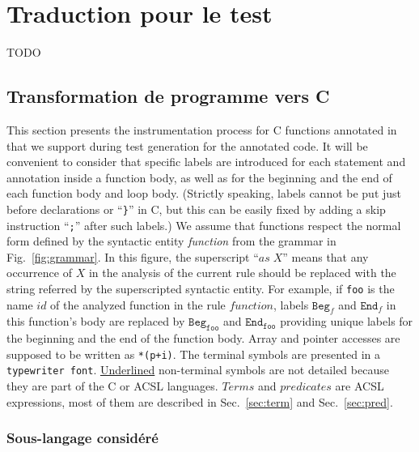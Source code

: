 
\chapter{Traduction pour le test}
\label{sec:traduction}

\chapterintro

TODO

\section{Transformation de programme \acsl vers C}





This section presents the instrumentation process for C functions annotated in
\acsl that we support during test generation for
the annotated code.
It will be convenient to consider that specific labels 
are introduced for each statement and annotation inside a function body, as well
as for  the beginning and the end of each function body and loop body. 
(Strictly speaking, labels cannot be put just before declarations or ``\lstinline|}|'' in C, but this
can be easily fixed by adding a skip instruction ``\lstinline{;}'' after such
labels.)
We assume that functions respect the normal form defined by the syntactic
entity \textit{function} from the grammar in Fig.~\ref{fig:grammar}. 
In this
figure, the superscript ``${\textit{as}\;X}$'' means that any occurrence of $X$
in the analysis of the current rule should be replaced with the string referred
by the superscripted syntactic entity.
For example, if \texttt{foo} is the name $id$ of the analyzed function in the
rule $function$, labels $\texttt{Beg}_f$ and $\texttt{End}_f$ in this function's
body are replaced by $\texttt{Beg}_{\texttt{foo}}$ and $\texttt{End}_{\texttt{foo}}$
providing unique labels for the beginning and the end of the function body.
Array and pointer accesses are supposed to be written as \lstinline|*(p+i)|.
The terminal symbols are presented in a \texttt{typewriter font}.
\underline{Underlined} non-terminal symbols are not detailed because they are
part of the C or ACSL languages.
$Terms$ and $predicates$ are ACSL expressions, most of them are described in
Sec.~\ref{sec:term} and Sec.~\ref{sec:pred}.



\subsection{Sous-langage considéré}


